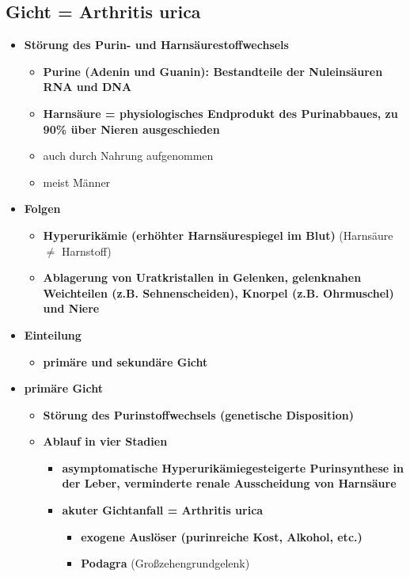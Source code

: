 \subsection{Gicht = Arthritis urica}
	\begin{itemize}
		\item \textbf{Störung des Purin- und Harnsäurestoffwechsels}
			\begin{itemize}
				\item \textbf{Purine (Adenin und Guanin): Bestandteile der Nuleinsäuren RNA und DNA}
				\item \textbf{Harnsäure = physiologisches Endprodukt des Purinabbaues, zu 90\% über Nieren ausgeschieden}
				\item auch durch Nahrung aufgenommen
				\item meist Männer
			\end{itemize}
\pagebreak
		\item \textbf{Folgen}
			\begin{itemize}
				\item \textbf{Hyperurikämie (erhöhter Harnsäurespiegel im Blut)} (Harnsäure $\neq$ Harnstoff)
				\item \textbf{Ablagerung von Uratkristallen in Gelenken, gelenknahen Weichteilen (z.B. Sehnenscheiden), Knorpel (z.B. Ohrmuschel) und Niere}
			\end{itemize}
		\item \textbf{Einteilung}
			\begin{itemize}
				\item \textbf{primäre und sekundäre Gicht}
			\end{itemize}
		\item \textbf{primäre Gicht}
			\begin{itemize}
				\item \textbf{Störung des Purinstoffwechsels (genetische Disposition)}
				\item \textbf{Ablauf in vier Stadien}
					\begin{itemize}
						\item \textbf{asymptomatische Hyperurikämiegesteigerte Purinsynthese in der Leber, verminderte renale Ausscheidung von Harnsäure}
						\item \textbf{akuter Gichtanfall = Arthritis urica}
							\begin{itemize}
								\item \textbf{exogene Auslöser (purinreiche Kost, Alkohol, etc.)}
								\item \textbf{Podagra} (Großzehengrundgelenk)

\end{itemize}
\end{itemize}
\end{itemize}
\end{itemize}
